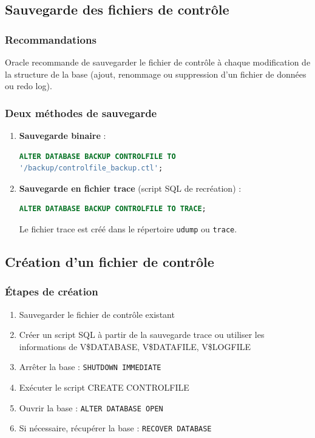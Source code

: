 \documentclass[12pt,a4paper]{article}
\begin{document}
\subsection{Sauvegarde des fichiers de contrôle}

\subsubsection{Recommandations}

Oracle recommande de sauvegarder le fichier de contrôle à chaque modification de la structure de la base (ajout, renommage ou suppression d'un fichier de données ou redo log).

\subsubsection{Deux méthodes de sauvegarde}

\begin{enumerate}
    \item \textbf{Sauvegarde binaire} :
    \begin{lstlisting}[language=SQL]
ALTER DATABASE BACKUP CONTROLFILE TO 
'/backup/controlfile_backup.ctl';
    \end{lstlisting}
    
    \item \textbf{Sauvegarde en fichier trace} (script SQL de recréation) :
    \begin{lstlisting}[language=SQL]
ALTER DATABASE BACKUP CONTROLFILE TO TRACE;
    \end{lstlisting}
    Le fichier trace est créé dans le répertoire \texttt{udump} ou \texttt{trace}.
\end{enumerate}

\subsection{Création d'un fichier de contrôle}

\subsubsection{Étapes de création}

\begin{enumerate}
    \item Sauvegarder le fichier de contrôle existant
    \item Créer un script SQL à partir de la sauvegarde trace ou utiliser les informations de V\$DATABASE, V\$DATAFILE, V\$LOGFILE
    \item Arrêter la base : \texttt{SHUTDOWN IMMEDIATE}
    \item Exécuter le script CREATE CONTROLFILE
    \item Ouvrir la base : \texttt{ALTER DATABASE OPEN}
    \item Si nécessaire, récupérer la base : \texttt{RECOVER DATABASE}
\end{enumerate}
\end{document}
